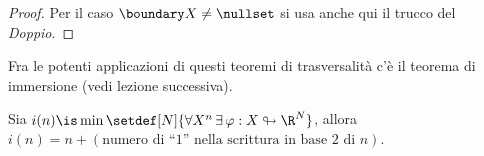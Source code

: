\begin{proof}

Per il caso $\boundary X \neq \nullset$ si usa anche qui il trucco del \emph{Doppio}.
\end{proof}

Fra le potenti applicazioni di questi teoremi di trasversalità c'è il teorema di immersione (vedi lezione successiva).

\begin{teo}
Sia $i(n) \is\min\setdef[N]{\forall X^n\,\exists\,\varphi: X \looparrowright \R^N}$, allora $i(n) = n + (\text{numero di ``1'' nella scrittura in base 2 di $n$})$. \footnotemark
\end{teo}

